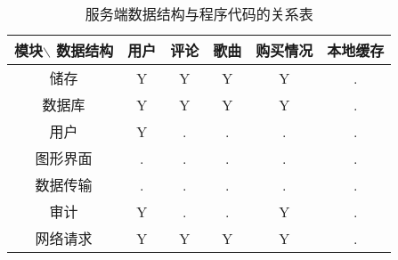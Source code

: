 \begin{table}[htbp]
    \centering
    \caption{服务端数据结构与程序代码的关系表} \label{tab:datastructure-module-server}
    \begin{tabular}{|c|c|c|c|c|c|}
        \hline
        模块$\backslash$ 数据结构 & 用户 & 评论 & 歌曲 & 购买情况 & 本地缓存 \\
        \hline
        储存 & Y & Y & Y & Y & . \\
        \hline
        数据库 & Y & Y & Y & Y & . \\
        \hline
        用户 & Y & . & . & . & . \\
        \hline
        图形界面 & . & . & . & . & . \\
        \hline
        数据传输 & . & . & . & . & . \\
        \hline
        审计 & Y & . & . & Y & . \\
        \hline
        网络请求 & Y & Y & Y & Y & . \\
        \hline
    \end{tabular}
    \end{table}